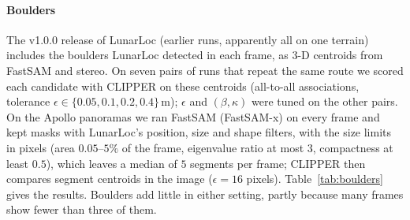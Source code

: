 \documentclass[letterpaper,journal]{IEEEtran}
\begin{document}
\paragraph*{Boulders} The v1.0.0 release of LunarLoc (earlier runs, apparently all on one terrain) includes the boulders
LunarLoc detected in each frame, as 3-D centroids from FastSAM and stereo. On seven pairs of runs that repeat the
same route we scored each candidate with CLIPPER on these centroids (all-to-all associations, tolerance
$\epsilon\in\{0.05,0.1,0.2,0.4\}$\,m); $\epsilon$ and $(\beta,\kappa)$ were tuned on the other pairs. On the Apollo
panoramas we ran FastSAM (FastSAM-x) on every frame and kept masks with LunarLoc's position, size and shape filters,
with the size limits in pixels (area $0.05$--$5\%$ of the frame, eigenvalue ratio at most $3$, compactness at least
$0.5$), which leaves a median of $5$ segments per frame; CLIPPER then compares segment centroids in the image
($\epsilon=16$ pixels). Table~\ref{tab:boulders} gives the results. Boulders add little in either setting, partly because
many frames show fewer than three of them.

\end{document}
